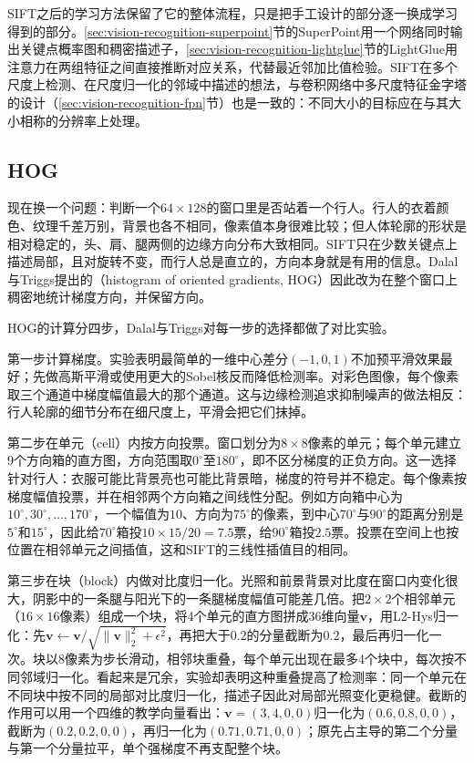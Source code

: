 SIFT之后的学习方法保留了它的整体流程，只是把手工设计的部分逐一换成学习得到的部分。\ref{sec:vision-recognition-superpoint}节的SuperPoint用一个网络同时输出关键点概率图和稠密描述子，\ref{sec:vision-recognition-lightglue}节的LightGlue用注意力在两组特征之间直接推断对应关系，代替最近邻加比值检验。SIFT在多个尺度上检测、在尺度归一化的邻域中描述的想法，与卷积网络中多尺度特征金字塔的设计（\ref{sec:vision-recognition-fpn}节）也是一致的：不同大小的目标应在与其大小相称的分辨率上处理。

\subsection{HOG}
\label{sec:vision-features-hog}

现在换一个问题：判断一个$64\times128$的窗口里是否站着一个行人。行人的衣着颜色、纹理千差万别，背景也各不相同，像素值本身很难比较；但人体轮廓的形状是相对稳定的，头、肩、腿两侧的边缘方向分布大致相同。SIFT只在少数关键点上描述局部，且对旋转不变，而行人总是直立的，方向本身就是有用的信息。Dalal与Triggs提出的（histogram of oriented gradients, HOG）因此改为在整个窗口上稠密地统计梯度方向，并保留方向。

HOG的计算分四步，Dalal与Triggs对每一步的选择都做了对比实验。

第一步计算梯度。实验表明最简单的一维中心差分$(-1,0,1)$不加预平滑效果最好；先做高斯平滑或使用更大的Sobel核反而降低检测率。对彩色图像，每个像素取三个通道中梯度幅值最大的那个通道。这与边缘检测追求抑制噪声的做法相反：行人轮廓的细节分布在细尺度上，平滑会把它们抹掉。

第二步在单元（cell）内按方向投票。窗口划分为$8\times8$像素的单元；每个单元建立9个方向箱的直方图，方向范围取$0^\circ$至$180^\circ$，即不区分梯度的正负方向。这一选择针对行人：衣服可能比背景亮也可能比背景暗，梯度的符号并不稳定。每个像素按梯度幅值投票，并在相邻两个方向箱之间线性分配。例如方向箱中心为$10^\circ,30^\circ,\ldots,170^\circ$，一个幅值为$10$、方向为$75^\circ$的像素，到中心$70^\circ$与$90^\circ$的距离分别是$5^\circ$和$15^\circ$，因此给$70^\circ$箱投$10\times15/20=7.5$票，给$90^\circ$箱投$2.5$票。投票在空间上也按位置在相邻单元之间插值，这和SIFT的三线性插值目的相同。

第三步在块（block）内做对比度归一化。光照和前景背景对比度在窗口内变化很大，阴影中的一条腿与阳光下的一条腿梯度幅值可能差几倍。把$2\times2$个相邻单元（$16\times16$像素）组成一个块，将4个单元的直方图拼成36维向量$\bm v$，用L2-Hys归一化：先$\bm v\gets\bm v/\sqrt{\lVert\bm v\rVert_2^2+\epsilon^2}$，再把大于$0.2$的分量截断为$0.2$，最后再归一化一次。块以8像素为步长滑动，相邻块重叠，每个单元出现在最多4个块中，每次按不同邻域归一化。看起来是冗余，实验却表明这种重叠提高了检测率：同一个单元在不同块中按不同的局部对比度归一化，描述子因此对局部光照变化更稳健。截断的作用可以用一个四维的教学向量看出：$\bm v=(3,4,0,0)$归一化为$(0.6,0.8,0,0)$，截断为$(0.2,0.2,0,0)$，再归一化为$(0.71,0.71,0,0)$；原先占主导的第二个分量与第一个分量拉平，单个强梯度不再支配整个块。


